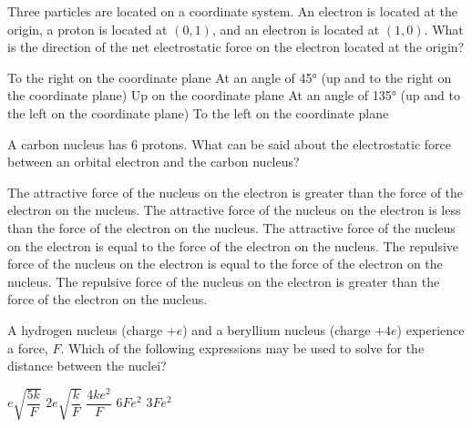 \documentclass{../../../oss-ap12ibhl-print}
\begin{document}
\begin{questions}
  \question Three particles are located on a coordinate system. An electron is
  located at the origin, a proton is located at $(0,1)$, and an electron is
  located at $(1,0)$. What is the direction of the net electrostatic force on
  the electron located at the origin?
  \begin{choices}
    \choice To the right on the coordinate plane
    \choice At an angle of \ang{45} (up and to the right on the coordinate
    plane)
    \choice Up on the coordinate plane
    \choice At an angle of \ang{135} (up and to the left on the coordinate
    plane)
    \choice To the left on the coordinate plane
  \end{choices}
     
  \question A carbon nucleus has 6 protons. What can be said about the
  electrostatic force between an orbital electron and the carbon nucleus?
  \begin{choices}
    \choice The attractive force of the nucleus on the electron is greater than
    the force of the electron on the nucleus.
    \choice The attractive force of the nucleus on the electron is less than the
    force of the electron on the nucleus.
    \choice The attractive force of the nucleus on the electron is equal to the
    force of the electron on the nucleus.
    \choice The repulsive force of the nucleus on the electron is equal to the
    force of the electron on the nucleus.
    \choice The repulsive force of the nucleus on the electron is greater than
    the force of the electron on the nucleus.
  \end{choices}
    
  \question A hydrogen nucleus (charge $+e$) and a beryllium nucleus (charge
  $+4e$) experience a force, $F$. Which of the following expressions may be
  used to solve for the distance between the nuclei?

  \begin{oneparchoices}
    \choice$e\sqrt{\dfrac{5k}F}$\hspace{.3in}
    \choice$2e\sqrt{\dfrac{k}F}$\hspace{.3in}
    \choice$\dfrac{4ke^2}F$\hspace{.3in}
    \choice$6Fe^2$\hspace{.3in}
    \choice$3Fe^2$
  \end{oneparchoices}
  \vspace{.1in}
     

\end{questions}
\end{document}
